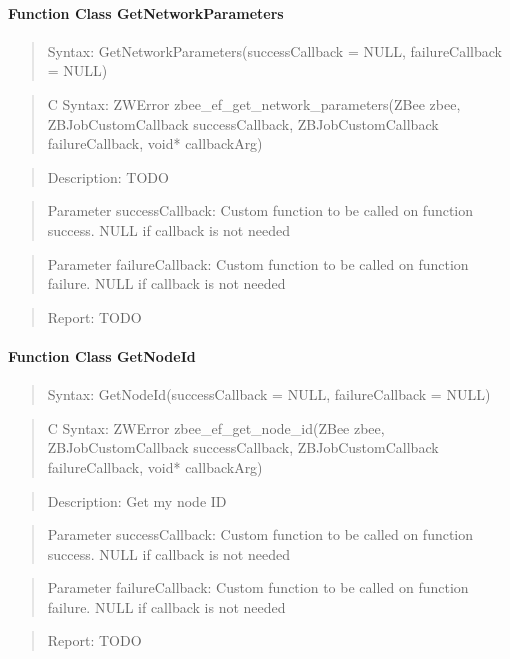 \paragraph{Function Class GetNetworkParameters}
\begin{quote}Syntax: GetNetworkParameters(successCallback = NULL, failureCallback = NULL)\end{quote}
\begin{quote}C Syntax: ZWError zbee\_ef\_get\_network\_parameters(ZBee zbee, ZBJobCustomCallback successCallback, ZBJobCustomCallback failureCallback, void* callbackArg)\end{quote}
\begin{quote}Description: TODO\end{quote}
\begin{quote}Parameter successCallback: Custom function to be called on function success. NULL if callback is not needed\end{quote}
\begin{quote}Parameter failureCallback: Custom function to be called on function failure. NULL if callback is not needed\end{quote}
\begin{quote}Report: TODO\end{quote}

\paragraph{Function Class GetNodeId}
\begin{quote}Syntax: GetNodeId(successCallback = NULL, failureCallback = NULL)\end{quote}
\begin{quote}C Syntax: ZWError zbee\_ef\_get\_node\_id(ZBee zbee, ZBJobCustomCallback successCallback, ZBJobCustomCallback failureCallback, void* callbackArg)\end{quote}
\begin{quote}Description: Get my node ID\end{quote}
\begin{quote}Parameter successCallback: Custom function to be called on function success. NULL if callback is not needed\end{quote}
\begin{quote}Parameter failureCallback: Custom function to be called on function failure. NULL if callback is not needed\end{quote}
\begin{quote}Report: TODO\end{quote}

